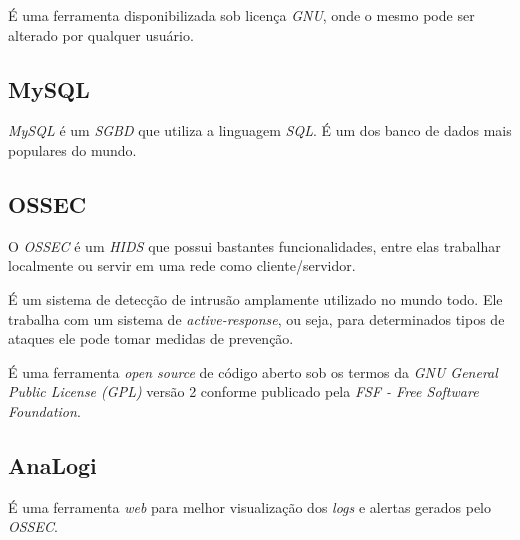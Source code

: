 É uma ferramenta disponibilizada sob licença \textit{GNU}, onde o mesmo pode ser alterado por qualquer usuário.

\subsection{MySQL}
\textit{MySQL} é um \textit{SGBD} que utiliza a linguagem \textit{SQL}. É um dos banco de dados mais populares do mundo.

\subsection{OSSEC}
O \textit{OSSEC} é um \textit{HIDS} que possui bastantes funcionalidades, entre elas trabalhar localmente ou servir em uma rede como cliente/servidor. 

É um sistema de detecção de intrusão amplamente utilizado no mundo todo. Ele trabalha com um sistema de \textit{active-response}, ou seja, para determinados tipos de ataques ele pode tomar medidas de prevenção.

É uma ferramenta \textit{open source} de código aberto sob os termos da \textit{GNU General Public License (GPL)} versão 2 conforme publicado pela \textit{FSF - Free Software Foundation}.

\subsection{AnaLogi}
É uma ferramenta \textit{web} para melhor visualização dos \textit{logs} e alertas gerados pelo \textit{OSSEC}.
